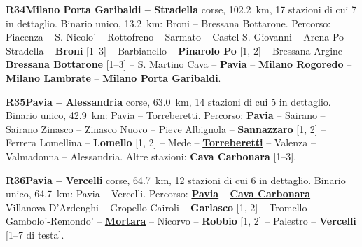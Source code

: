 \medskip\noindent\hypertarget{lin:R34}{\textbf{R34\enspace Milano Porta Garibaldi -- Stradella}} corse, \SI{102,2}{\km}, 17 stazioni di cui 7 in dettaglio. Binario unico, \SI{13,2}{\km}: Broni -- Bressana Bottarone. Percorso: Piacenza -- S. Nicolo' -- Rottofreno -- Sarmato -- Castel S. Giovanni -- Arena Po -- Stradella -- \hypertarget{sta:S01944}{\textbf{Broni}} [1--3] -- Barbianello -- \hypertarget{sta:S01931}{\textbf{Pinarolo Po}} [1, 2] -- Bressana Argine -- \hypertarget{sta:S01805}{\textbf{Bressana Bottarone}} [1--3] -- S. Martino Cava -- \hyperlink{sta:S01860}{\textbf{Pavia}} -- \hyperlink{sta:S01820}{\textbf{Milano Rogoredo}} -- \hyperlink{sta:S01701}{\textbf{Milano Lambrate}} -- \hyperlink{sta:S01645}{\textbf{Milano Porta Garibaldi}}.

\medskip\noindent\hypertarget{lin:R35}{\textbf{R35\enspace Pavia -- Alessandria}} corse, \SI{63,0}{\km}, 14 stazioni di cui 5 in dettaglio. Binario unico, \SI{42,9}{\km}: Pavia -- Torreberetti. Percorso: \hyperlink{sta:S01860}{\textbf{Pavia}} -- Sairano -- Sairano Zinasco -- Zinasco Nuovo -- Pieve Albignola -- \hypertarget{sta:S00403}{\textbf{Sannazzaro}} [1, 2] -- Ferrera Lomellina -- \hypertarget{sta:S00405}{\textbf{Lomello}} [1, 2] -- Mede -- \hyperlink{sta:S00039}{\textbf{Torreberetti}} -- Valenza -- Valmadonna -- Alessandria. Altre stazioni: \hypertarget{sta:S00279}{\textbf{Cava Carbonara}} [1--3].

\medskip\noindent\hypertarget{lin:R36}{\textbf{R36\enspace Pavia -- Vercelli}} corse, \SI{64,7}{\km}, 12 stazioni di cui 6 in dettaglio. Binario unico, \SI{64,7}{\km}: Pavia -- Vercelli. Percorso: \hyperlink{sta:S01860}{\textbf{Pavia}} -- \hyperlink{sta:S00279}{\textbf{Cava Carbonara}} -- Villanova D'Ardenghi -- Gropello Cairoli -- \hypertarget{sta:S00276}{\textbf{Garlasco}} [1, 2] -- Tromello -- Gambolo'-Remondo' -- \hyperlink{sta:S00034}{\textbf{Mortara}} -- Nicorvo -- \hypertarget{sta:S00272}{\textbf{Robbio}} [1, 2] -- Palestro -- \hypertarget{sta:S00245}{\textbf{Vercelli}} [1--7 di testa].

